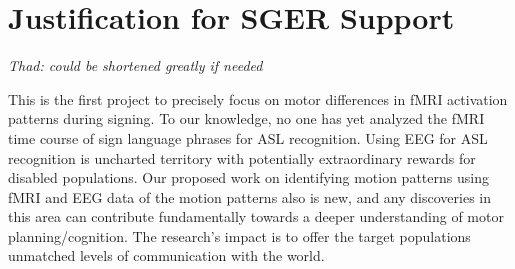 \documentclass{proposal}
\begin{document}


\section{Justification for SGER Support}
\textit{Thad: could be shortened greatly if needed}

This is the first project to precisely focus on motor differences in fMRI activation patterns during signing. To our knowledge, no one has yet analyzed the fMRI time course of sign language phrases for ASL recognition. Using EEG for ASL recognition is uncharted territory with potentially extraordinary rewards for disabled populations. Our proposed work on identifying motion patterns using fMRI and EEG data of the motion patterns also is new, and any discoveries in this area can contribute fundamentally towards a deeper understanding of motor planning/cognition. The research's impact is to offer the target populations unmatched levels of communication with the world.
\end{document}
